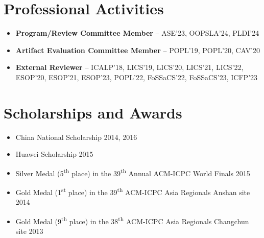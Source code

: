\documentclass[11pt,letterpaper,roman]{moderncv}        %
\begin{document}
\section{Professional Activities}

\begin{itemize}
  \item \textbf{Program/Review Committee Member} -- ASE'23, OOPSLA'24, PLDI'24
  \item \textbf{Artifact Evaluation Committee Member} -- POPL'19, POPL'20, CAV'20
  \item \textbf{External Reviewer} -- ICALP'18, LICS'19, LICS'20, LICS'21, LICS'22, ESOP'20, ESOP'21, ESOP'23, POPL'22, FoSSaCS'22, FoSSaCS'23, ICFP'23
\end{itemize}

%
%
%
%
%
%
%

\section{Scholarships and Awards}

\begin{itemize}
\item China National Scholarship \hfill 2014, 2016
\item Huawei Scholarship \hfill 2015

  \vspace{4pt}

  \item Silver Medal (5\textsuperscript{th} place) in the 39\textsuperscript{th} Annual ACM-ICPC World Finals \hfill 2015
  \item Gold Medal (1\textsuperscript{st} place) in the 39\textsuperscript{th} ACM-ICPC Asia Regionals Anshan site \hfill 2014
  \item Gold Medal (9\textsuperscript{th} place) in the 38\textsuperscript{th} ACM-ICPC Asia Regionals Changchun site \hfill 2013
\end{itemize}
\end{document}
